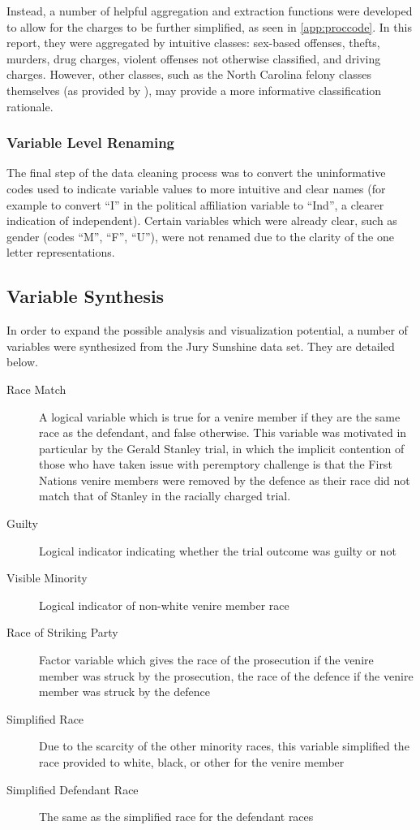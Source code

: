 Instead, a number of helpful aggregation and extraction functions were developed to allow for the charges to be further
simplified, as seen in \ref{app:proccode}. In this report, they were aggregated by intuitive classes: sex-based offenses, thefts,
murders, drug charges, violent offenses not otherwise classified, and driving charges. However, other classes, such as the North
Carolina felony classes themselves (as provided by \cite{offenseclass}), may provide a more informative classification rationale.

\subsubsection{Variable Level Renaming}

The final step of the data cleaning process was to convert the uninformative codes used to indicate variable values to more
intuitive and clear names (for example to convert ``I'' in the political affiliation variable to ``Ind'', a clearer indication of
independent). Certain variables which were already clear, such as gender (codes ``M'', ``F'', ``U''), were not renamed due to the
clarity of the one letter representations.

\subsection{Variable Synthesis}

In order to expand the possible analysis and visualization potential, a number of variables were synthesized from the Jury
Sunshine data set. They are detailed below.

\begin{description}
  \item[Race Match] A logical variable which is true for a venire member if they are the same race as the defendant, and false
    otherwise. This variable was motivated in particular by the Gerald Stanley trial, in which the implicit contention of those
    who have taken issue with peremptory challenge is that the First Nations venire members were removed by the defence as their
    race did not match that of Stanley in the racially charged trial.
  \item[Guilty] Logical indicator indicating whether the trial outcome was guilty or not
  \item[Visible Minority] Logical indicator of non-white venire member race
  \item[Race of Striking Party] Factor variable which gives the race of the prosecution if the venire member was struck by the
    prosecution, the race of the defence if the venire member was struck by the defence
  \item[Simplified Race] Due to the scarcity of the other minority races, this variable simplified the race provided to white,
    black, or other for the venire member
  \item[Simplified Defendant Race] The same as the simplified race for the defendant races
\end{description}

